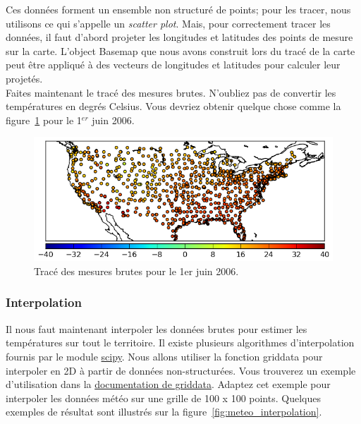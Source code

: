 Ces données forment un ensemble non structuré de points; pour les tracer, nous utilisons ce qui s'appelle un \emph{scatter plot}. Mais, pour correctement tracer les données, il faut d'abord projeter les longitudes et latitudes des points de mesure sur la carte. L'object Basemap que nous avons construit lors du tracé de la carte peut être appliqué à des vecteurs de longitudes et latitudes pour calculer leur projetés.\\
\cprotect{}
Faites maintenant le tracé des mesures brutes. N'oubliez pas de convertir les températures en degrés Celsius. Vous devriez obtenir quelque chose comme la figure~\ref{fig:meteo_rawtemp} pour le 1$^{er}$ juin 2006.\\

\begin{figure}[htbp]
\includegraphics[width=0.7\linewidth]{Figs/meteo_rawtemp.png}
\caption{\label{fig:meteo_rawtemp} Tracé des mesures brutes pour le 1er juin 2006.}
\end{figure}

\subsubsection{Interpolation}

Il nous faut maintenant interpoler les données brutes pour estimer les températures sur tout le territoire. Il existe plusieurs algorithmes d'interpolation fournis par le module \href{http://docs.scipy.org/doc/scipy/reference/interpolate.html}{scipy}. Nous allons utiliser la fonction griddata pour interpoler en 2D à partir de données non-structurées. Vous trouverez un exemple d'utilisation dans la \href{http://docs.scipy.org/doc/scipy/reference/generated/scipy.interpolate.griddata.html#scipy.interpolate.griddata}{documentation de griddata}. Adaptez cet exemple pour interpoler les données météo sur une grille de 100 x 100 points. Quelques exemples de résultat sont illustrés sur la figure~\ref{fig:meteo_interpolation}.

